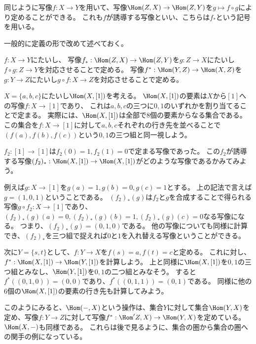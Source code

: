 \documentclass{jsarticle}
\begin{document}
同じように写像$f:X \to Y$を用いて、写像$\Hom(Z,X) \to \Hom(Z,Y)$を$g \mapsto f \circ g$により定めることができる。
これも$f$が誘導する写像といい、こちらは$f_*$という記号を用いる。

一般的に定義の形で改めて述べておく。
\begin{dfn}
$f:X \to Y$にたいし、
写像$f_*:\Hom(Z,X)\to\Hom(Z,Y)$を$g:Z\to X$にたいし$f\circ g:Z\to Y$を対応させることで定める。
写像$f^*:\Hom(Y,Z)\to\Hom(X,Z)$を$g:Y\to Z$にたいし$g\circ f:X\to Z$を対応させることで定める。
\end{dfn}

\begin{eg}
$X=\{a,b,c\}$にたいし$\Hom(X,[1])$を考える。
$\Hom(X,[1])$の要素は$X$から$[1]$への写像$f:X \to [1]$であり、
これは$a, b, c$の三つに$0, 1$のいずれかを割り当てることで定まる。
実際には、$\Hom(X, [1])$は全部で$8$個の要素からなる集合である。
この集合を$f:X \to [1]$に対して$a, b, c$それぞれの行き先を並べることで$(f(a), f(b), f(c))$という$0,1$の三つ組と同一視しよう。

\vspace{5pt}

$f_2:[1] \to [1]$は$f_2(0)=1, f_2(1)=0$で定まる写像であった。
この$f_2$が誘導する写像$(f_2)_*:\Hom(X,[1]) \to \Hom(X, [1])$がどのような写像であるかみてみよう。

\vspace{5pt}

例えば$g:X \to [1]$を$g(a)=1, g(b)=0, g(c)=1$とする。
上の記法で言えば$g=(1,0,1)$ということである。
$(f_2)_*(g)$は$f_2$と$g$を合成することで得られる写像$g\circ f_2:X \to [1]$であり、$(f_2)_*(g)(a)=0, (f_2)_*(g)(b)=1, (f_2)_*(g)(c)=0$なる写像になる。
つまり、$(f_2)_*(g)=(0,1,0)$である。
他の写像についても同様に計算でき、$(f_2)_*$を三つ組で捉えれば$0$と$1$を入れ替える写像ということができる。

\vspace{5pt}

次に$Y=\{s,t\}$として、$f:Y \to X$を$f(s)=a, f(t)=c$と定める。
これに対し、$f^*:\Hom(X,[1]) \to \Hom(Y,[1])$を計算しよう。
上と同様に$\Hom(X,[1])$を$0,1$の三つ組とみなし、$\Hom(Y,[1])$を$0, 1$の二つ組とみなそう。
すると$f^*((0,1,0))=(0,0)$であり、$f^*((0,1,1))=(0,1)$である。
同様に他の$6$個の$\Hom(X,[1])$の要素の行き先も計算してみよう。
\end{eg}

\vspace{15pt}

このようにみると、$\Hom(-,X)$という操作は、集合$Y$に対して集合$\Hom(Y,X)$を定め、写像$f:Y \to Z$に対して写像$f^*:\Hom'Z,X) \to \Hom(Y,X)$を定めている。
$\Hom(X,-)$も同様である。
これらは後で見るように、集合の圏から集合の圏への関手の例になっている。
\end{document}
